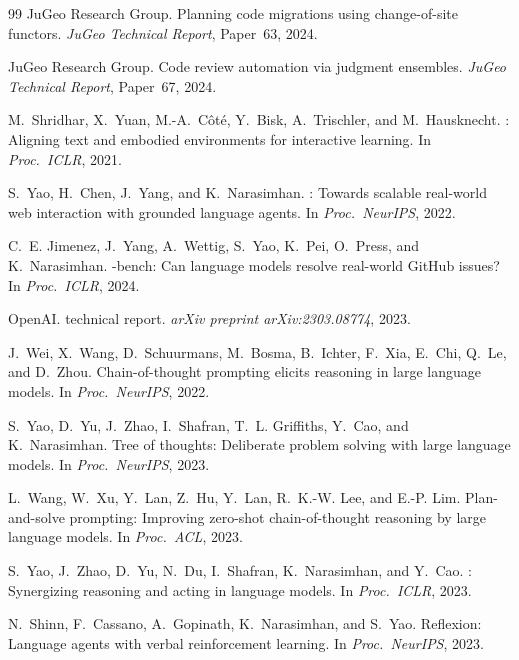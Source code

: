 \documentclass[11pt]{article}
\begin{document}
\begin{thebibliography}{99}
JuGeo Research Group.
\newblock Planning code migrations using change-of-site functors.
\newblock \emph{JuGeo Technical Report}, Paper~63, 2024.

JuGeo Research Group.
\newblock Code review automation via judgment ensembles.
\newblock \emph{JuGeo Technical Report}, Paper~67, 2024.

M.~Shridhar, X.~Yuan, M.-A.~C\^ot\'e, Y.~Bisk, A.~Trischler,
  and M.~Hausknecht.
: Aligning text and embodied environments for
  interactive learning.
\newblock In \emph{Proc.\ ICLR}, 2021.

S.~Yao, H.~Chen, J.~Yang, and K.~Narasimhan.
: Towards scalable real-world web interaction with
  grounded language agents.
\newblock In \emph{Proc.\ NeurIPS}, 2022.

C.~E. Jimenez, J.~Yang, A.~Wettig, S.~Yao, K.~Pei, O.~Press,
  and K.~Narasimhan.
-bench: Can language models resolve real-world
  {GitHub} issues?
\newblock In \emph{Proc.\ ICLR}, 2024.

OpenAI.
 technical report.
\newblock \emph{arXiv preprint arXiv:2303.08774}, 2023.

J.~Wei, X.~Wang, D.~Schuurmans, M.~Bosma, B.~Ichter, F.~Xia,
  E.~Chi, Q.~Le, and D.~Zhou.
\newblock Chain-of-thought prompting elicits reasoning in large
  language models.
\newblock In \emph{Proc.\ NeurIPS}, 2022.

S.~Yao, D.~Yu, J.~Zhao, I.~Shafran, T.~L. Griffiths, Y.~Cao,
  and K.~Narasimhan.
\newblock Tree of thoughts: Deliberate problem solving with large
  language models.
\newblock In \emph{Proc.\ NeurIPS}, 2023.

L.~Wang, W.~Xu, Y.~Lan, Z.~Hu, Y.~Lan, R.~K.-W. Lee, and
  E.-P. Lim.
\newblock Plan-and-solve prompting: Improving zero-shot
  chain-of-thought reasoning by large language models.
\newblock In \emph{Proc.\ ACL}, 2023.

S.~Yao, J.~Zhao, D.~Yu, N.~Du, I.~Shafran, K.~Narasimhan,
  and Y.~Cao.
: Synergizing reasoning and acting in language
  models.
\newblock In \emph{Proc.\ ICLR}, 2023.

N.~Shinn, F.~Cassano, A.~Gopinath, K.~Narasimhan, and S.~Yao.
\newblock Reflexion: Language agents with verbal reinforcement
  learning.
\newblock In \emph{Proc.\ NeurIPS}, 2023.


\end{thebibliography}
\end{document}
